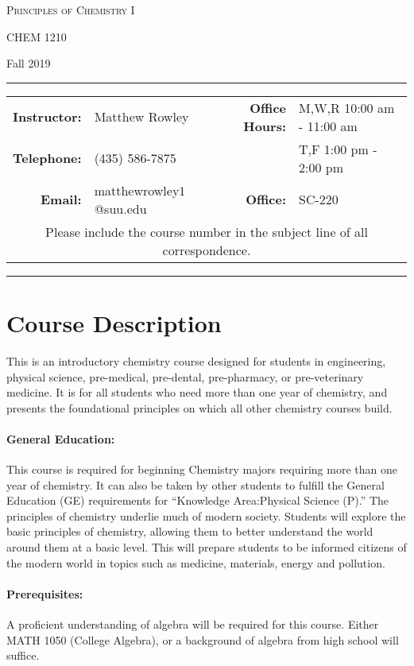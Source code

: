 \documentclass[12pt, letterpaper]{article}
\begin{document}
\begin{center}
{\Large \textsc{Principles of Chemistry I}}

CHEM 1210
\end{center}
\begin{center}
{\large Fall 2019}
\end{center}
\begin{center}
	\rule{0.97\textwidth}{0.4pt}
	\begin{tabular}{rlcrl}
		\textbf{Instructor:} & Matthew Rowley & & \textbf{Office Hours:} & M,W,R 10:00 am - 11:00 am \\
		\textbf{Telephone:} & (435) 586-7875 & & & T,F 1:00 pm - 2:00 pm\\
		\textbf{Email:} & \multicolumn{2}{l}{matthewrowley$1$@suu.edu} & \textbf{Office:} & SC-220\\
		\multicolumn{5}{c}{Please include the course number in the subject line of all correspondence.} 
	\end{tabular}
	\rule{0.97\textwidth}{0.4pt}
\end{center}

\section*{Course Description} 
This is an introductory chemistry course designed for students in engineering, physical science, pre-medical, pre-dental, pre-pharmacy, or pre-veterinary medicine. It is for all students who need more than one year of chemistry, and presents the foundational principles on which all other chemistry courses build.

\paragraph{General Education:}
This course is required for beginning Chemistry majors requiring more than one year of chemistry. It can also be taken by other students to fulfill the General Education (GE) requirements for ``Knowledge Area:Physical Science (P).'' The principles of chemistry underlie much of modern society. Students will explore the basic principles of chemistry, allowing them to better understand the world around them at a basic level. This will prepare students to be informed citizens of the modern world in topics such as medicine, materials, energy and pollution.

\paragraph{Prerequisites:}
A proficient understanding of algebra will be required for this course. Either MATH 1050 (College Algebra), or a background of algebra from high school will suffice.
\end{document}
